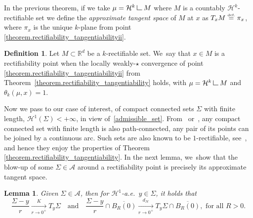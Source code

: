 \documentclass[JEP,XML,SOM,Unicode,NoFloatCountersInSection,published]{cedram}
\let\ts\textstyle
\newtheorem{lemma}[theorem]{Lemma}
\theoremstyle{definition}
\newtheorem{definition}[theorem]{Definition}
\newcommand{\eqdef}{\ensuremath{\stackrel{\mbox{\upshape\tiny def.}}{=}}}
\newcommand\LM[1]{\hbox{\vrule width.5pt \vbox to#1pt{\vfill \hrule width#1pt height.5pt}}}
\newcommand\LL{{\mathchoice {\>\LM7\>}{\>\LM7\>}{\,\LM5\,}{\,\LM{3.35}\,}}}
\newcommand{\mres}{\LL}
\newcommand\cH{\mathcal{H}}
\newcommand{\RR}{\mathbb{R}}
\newcommand{\distH}{d_{\mathcal{H}}}
\begin{document}
In the previous theorem, if we take $\mu = \cH^k\mres M$ where $M$ is a countably $\cH^k$\nobreakdash-rectifiable set we define the \emph{approximate tangent space} of $M$ at $x$ as $T_x M \eqdef \pi_x$, where $\pi_x$ is the unique $k$-plane from point \eqref{theorem.rectifiability_tangentiabilityii}.

\begin{definition}\label{definiton.rectifiability_point}
Let $M\subset \RR^d$ be a $k$-rectifiable set. We~say that $x \in M$ is a rectifiability point when the locally weakly-$\star$ convergence of point \eqref{theorem.rectifiability_tangentiabilityii} from Theorem~\ref{theorem.rectifiability_tangentiability} holds, with $\mu = \cH^k\mres M$ and $\theta_k(\mu,x)=1$.
\end{definition}

Now we pass to our case of interest, of compact connected sets $\Sigma$ with finite length, $\mathcal{H}^1(\Sigma) < +\infty$, in view of~\eqref{admissible_set}. From~\cite[Prop.\,30.1 \& Cor.\,30.2]{david2006singular} or~\cite[Th.\,4.4]{alberti2017structure}, any compact connected set with finite length is also path-connected, \ie any pair of its points can be joined by a continuous arc. Such sets are also known to be $1$-rectifiable, see~\cite[Th.\,4.4.8]{ambrosio2004topics}, and hence they enjoy the properties of Theorem \ref{theorem.rectifiability_tangentiability}. In the next lemma, we~show that the blow-up of some $\Sigma \in \mathcal{A}$ around a rectifiability point is precisely its approximate tangent space.

\begin{lemma}\label{lemma.blowup_domain_measure}
Given $\Sigma \in \mathcal{A}$, then for $\cH^1$-a.e.\ $y \in \Sigma$, it holds that
\[
\frac{\Sigma - y}{r} \xrightarrow[r \to 0^+]{\ts K} T_y\Sigma
\quad \text{and} \quad
\frac{\Sigma - y}{r}\cap \overline{B_R(0)} \xrightarrow[r \to 0^+]{\ts\distH} T_y\Sigma\cap \overline{B_R(0)}, \text{ for all $R>0$.}
\]
\end{lemma}
\end{document}
